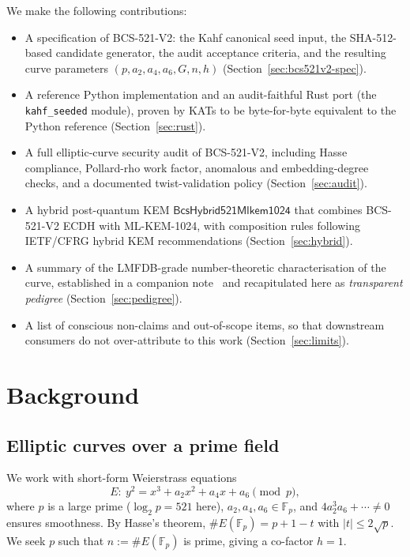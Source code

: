 \documentclass[11pt,a4paper]{article}
\theoremstyle{plain}
\theoremstyle{definition}
\newcommand{\F}{\mathbb{F}}
\newcommand{\BCSV}{\textsf{BCS\hbox{-}521\hbox{-}V2}}
\newcommand{\MLKEM}{\textsf{ML\hbox{-}KEM\hbox{-}1024}}
\begin{document}
We make the following contributions:
\begin{itemize}
  \item A specification of \BCSV{}: the Kahf canonical seed input,
    the SHA-512-based candidate generator, the audit acceptance
    criteria, and the resulting curve parameters
    $(p, a_2, a_4, a_6, G, n, h)$
    (Section~\ref{sec:bcs521v2-spec}).
  \item A reference Python implementation and an audit-faithful
    Rust port (the \texttt{kahf\_seeded} module), proven by KATs to
    be byte-for-byte equivalent to the Python reference
    (Section~\ref{sec:rust}).
  \item A full elliptic-curve security audit of \BCSV{}, including
    Hasse compliance, Pollard-rho work factor, anomalous and
    embedding-degree checks, and a documented twist-validation
    policy (Section~\ref{sec:audit}).
  \item A hybrid post-quantum KEM
    $\textsf{BcsHybrid521Mlkem1024}$ that combines \BCSV{} ECDH with
    \MLKEM{}, with composition rules following IETF/CFRG hybrid
    KEM recommendations (Section~\ref{sec:hybrid}).
  \item A summary of the LMFDB-grade number-theoretic
    characterisation of the curve, established in a companion
    note~\cite{PellNote2026} and recapitulated here as
    \emph{transparent pedigree}
    (Section~\ref{sec:pedigree}).
  \item A list of conscious non-claims and out-of-scope items, so
    that downstream consumers do not over-attribute to this work
    (Section~\ref{sec:limits}).
\end{itemize}

\section{Background}
\label{sec:background}

\subsection{Elliptic curves over a prime field}

We work with short-form Weierstrass equations
\begin{equation*}
  E\colon\ y^2 = x^3 + a_2 x^2 + a_4 x + a_6
  \pmod{p},
\end{equation*}
where $p$ is a large prime ($\log_2 p = 521$ here),
$a_2, a_4, a_6 \in \F_p$, and $4 a_2^3 a_6 + \cdots \neq 0$ ensures
smoothness. By Hasse's theorem,
$\#E(\F_p) = p + 1 - t$ with $|t| \le 2\sqrt p$. We seek $p$ such
that $n := \#E(\F_p)$ is prime, giving a co-factor $h = 1$.
\end{document}
